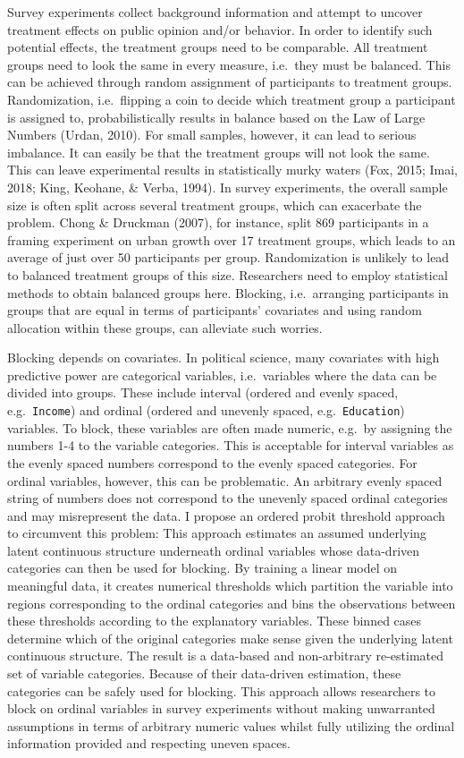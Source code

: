 \documentclass[12pt,econ]{sources/authesis}
\begin{document}
Survey experiments collect background information and attempt to uncover treatment effects on public opinion and/or behavior. In order to identify such potential effects, the treatment groups need to be comparable. All treatment groups need to look the same in every measure, i.e.~they must be balanced. This can be achieved through random assignment of participants to treatment groups. Randomization, i.e.~flipping a coin to decide which treatment group a participant is assigned to, probabilistically results in balance based on the Law of Large Numbers (Urdan, 2010). For small samples, however, it can lead to serious imbalance. It can easily be that the treatment groups will not look the same. This can leave experimental results in statistically murky waters (Fox, 2015; Imai, 2018; King, Keohane, \& Verba, 1994). In survey experiments, the overall sample size is often split across several treatment groups, which can exacerbate the problem. Chong \& Druckman (2007), for instance, split 869 participants in a framing experiment on urban growth over 17 treatment groups, which leads to an average of just over 50 participants per group. Randomization is unlikely to lead to balanced treatment groups of this size. Researchers need to employ statistical methods to obtain balanced groups here. Blocking, i.e.~arranging participants in groups that are equal in terms of participants' covariates and using random allocation within these groups, can alleviate such worries.

Blocking depends on covariates. In political science, many covariates with high predictive power are categorical variables, i.e.~variables where the data can be divided into groups. These include interval (ordered and evenly spaced, e.g.~\texttt{Income}) and ordinal (ordered and unevenly spaced, e.g.~\texttt{Education}) variables. To block, these variables are often made numeric, e.g.~by assigning the numbers 1-4 to the variable categories. This is acceptable for interval variables as the evenly spaced numbers correspond to the evenly spaced categories. For ordinal variables, however, this can be problematic. An arbitrary evenly spaced string of numbers does not correspond to the unevenly spaced ordinal categories and may misrepresent the data. I propose an ordered probit threshold approach to circumvent this problem: This approach estimates an assumed underlying latent continuous structure underneath ordinal variables whose data-driven categories can then be used for blocking. By training a linear model on meaningful data, it creates numerical thresholds which partition the variable into regions corresponding to the ordinal categories and bins the observations between these thresholds according to the explanatory variables. These binned cases determine which of the original categories make sense given the underlying latent continuous structure. The result is a data-based and non-arbitrary re-estimated set of variable categories. Because of their data-driven estimation, these categories can be safely used for blocking. This approach allows researchers to block on ordinal variables in survey experiments without making unwarranted assumptions in terms of arbitrary numeric values whilst fully utilizing the ordinal information provided and respecting uneven spaces.
\end{document}
